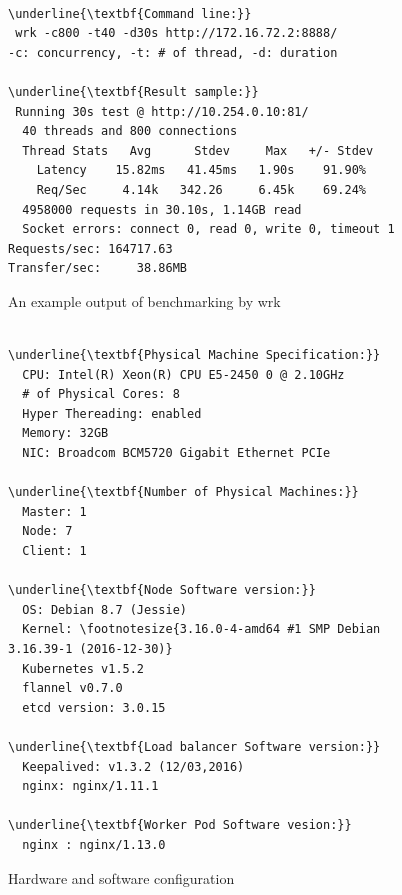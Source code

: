 \begin{figure}
\begin{minipage}{\columnwidth}
\small
\begin{Verbatim}[commandchars=\\\{\}]

\underline{\textbf{Command line:}}
 wrk -c800 -t40 -d30s http://172.16.72.2:8888/
-c: concurrency, -t: # of thread, -d: duration

\underline{\textbf{Result sample:}}
 Running 30s test @ http://10.254.0.10:81/
  40 threads and 800 connections
  Thread Stats   Avg      Stdev     Max   +/- Stdev
    Latency    15.82ms   41.45ms   1.90s    91.90%
    Req/Sec     4.14k   342.26     6.45k    69.24%
  4958000 requests in 30.10s, 1.14GB read
  Socket errors: connect 0, read 0, write 0, timeout 1
Requests/sec: 164717.63
Transfer/sec:     38.86MB

\end{Verbatim}
\end{minipage}
\caption{An example output of benchmarking by wrk}
\label{fig:benchmark example}
\end{figure}

\begin{figure}
\begin{minipage}{0.9\columnwidth}
\small
\begin{Verbatim}[commandchars=\\\{\}]

\underline{\textbf{Physical Machine Specification:}}
  CPU: Intel(R) Xeon(R) CPU E5-2450 0 @ 2.10GHz
  # of Physical Cores: 8
  Hyper Thereading: enabled
  Memory: 32GB
  NIC: Broadcom BCM5720 Gigabit Ethernet PCIe

\underline{\textbf{Number of Physical Machines:}}
  Master: 1
  Node: 7
  Client: 1

\underline{\textbf{Node Software version:}}
  OS: Debian 8.7 (Jessie)
  Kernel: \footnotesize{3.16.0-4-amd64 #1 SMP Debian 3.16.39-1 (2016-12-30)}
  Kubernetes v1.5.2
  flannel v0.7.0
  etcd version: 3.0.15

\underline{\textbf{Load balancer Software version:}}
  Keepalived: v1.3.2 (12/03,2016)
  nginx: nginx/1.11.1

\underline{\textbf{Worker Pod Software vesion:}}
  nginx : nginx/1.13.0 

\end{Verbatim}
\end{minipage}
\caption{Hardware and software configuration}
\label{fig:Hardware and software configuration}
\end{figure}



